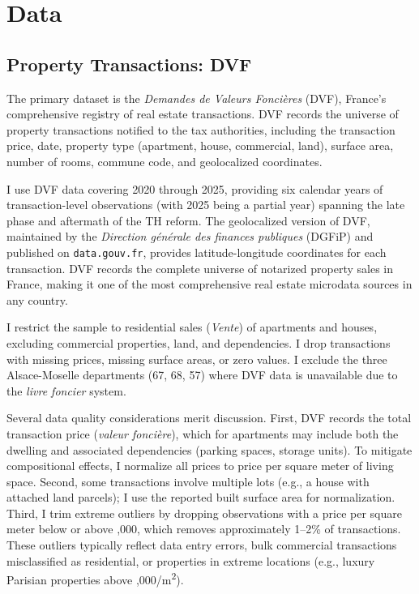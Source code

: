 \documentclass[12pt]{article}
\begin{document}
\section{Data}

\subsection{Property Transactions: DVF}

The primary dataset is the \emph{Demandes de Valeurs Fonci\`eres} (DVF), France's comprehensive registry of real estate transactions. DVF records the universe of property transactions notified to the tax authorities, including the transaction price, date, property type (apartment, house, commercial, land), surface area, number of rooms, commune code, and geolocalized coordinates.

I use DVF data covering 2020 through 2025, providing six calendar years of transaction-level observations (with 2025 being a partial year) spanning the late phase and aftermath of the TH reform. The geolocalized version of DVF, maintained by the \emph{Direction g\'en\'erale des finances publiques} (DGFiP) and published on \texttt{data.gouv.fr}, provides latitude-longitude coordinates for each transaction. DVF records the complete universe of notarized property sales in France, making it one of the most comprehensive real estate microdata sources in any country.

I restrict the sample to residential sales (\emph{Vente}) of apartments and houses, excluding commercial properties, land, and dependencies. I drop transactions with missing prices, missing surface areas, or zero values. I exclude the three Alsace-Moselle departments (67, 68, 57) where DVF data is unavailable due to the \emph{livre foncier} system.

Several data quality considerations merit discussion. First, DVF records the total transaction price (\emph{valeur fonci\`ere}), which for apartments may include both the dwelling and associated dependencies (parking spaces, storage units). To mitigate compositional effects, I normalize all prices to price per square meter of living space. Second, some transactions involve multiple lots (e.g., a house with attached land parcels); I use the reported built surface area for normalization. Third, I trim extreme outliers by dropping observations with a price per square meter below  or above ,000, which removes approximately 1--2\% of transactions. These outliers typically reflect data entry errors, bulk commercial transactions misclassified as residential, or properties in extreme locations (e.g., luxury Parisian properties above ,000/m\textsuperscript{2}).
\end{document}
